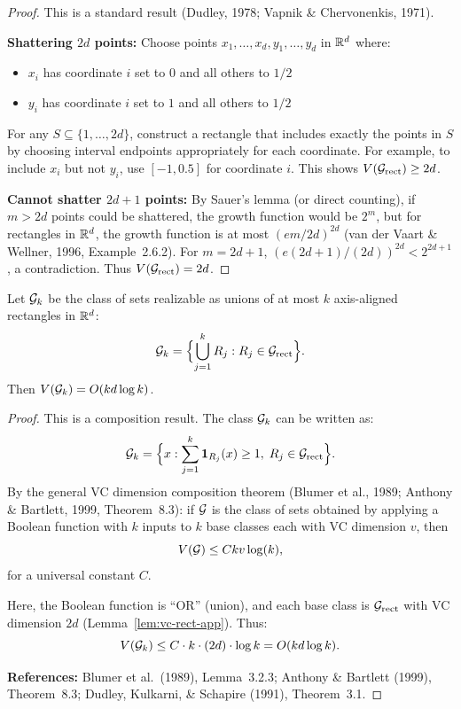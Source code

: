 \documentclass[12pt]{article}
\begin{document}
\begin{proof}
This is a standard result (Dudley, 1978; Vapnik \& Chervonenkis, 1971).

\textbf{Shattering $2d$ points:} Choose points $x_1, \ldots, x_d, y_1, \ldots, y_d$ in $\mathbb{R}^d$ where:
\begin{itemize}
\item $x_i$ has coordinate $i$ set to $0$ and all others to $1/2$
\item $y_i$ has coordinate $i$ set to $1$ and all others to $1/2$
\end{itemize}
For any $S \subseteq \{1,\ldots,2d\}$, construct a rectangle that includes exactly the points in $S$ by choosing interval endpoints appropriately for each coordinate. For example, to include $x_i$ but not $y_i$, use $[-1, 0.5]$ for coordinate $i$. This shows $V(\mathcal{G}_{\text{rect}}) \ge 2d$.

\textbf{Cannot shatter $2d+1$ points:} By Sauer's lemma (or direct counting), if $m > 2d$ points could be shattered, the growth function would be $2^m$, but for rectangles in $\mathbb{R}^d$, the growth function is at most $(em/2d)^{2d}$ (van der Vaart \& Wellner, 1996, Example~2.6.2). For $m = 2d+1$, $(e(2d+1)/(2d))^{2d} < 2^{2d+1}$, a contradiction. Thus $V(\mathcal{G}_{\text{rect}}) = 2d$.
\end{proof}

\begin{lemma}
\label{lem:vc-union-app}
Let $\mathcal{G}_k$ be the class of sets realizable as unions of at most $k$ axis-aligned rectangles in $\mathbb{R}^d$:
\[
\mathcal{G}_k = \Bigl\{ \bigcup_{j=1}^k R_j : R_j \in \mathcal{G}_{\text{rect}} \Bigr\}.
\]
Then $V(\mathcal{G}_k) = O(kd \log k)$.
\end{lemma}

\begin{proof}
This is a composition result. The class $\mathcal{G}_k$ can be written as:
\[
\mathcal{G}_k = \Bigl\{ x : \sum_{j=1}^k \mathbf{1}_{R_j}(x) \ge 1, \; R_j \in \mathcal{G}_{\text{rect}} \Bigr\}.
\]
By the general VC dimension composition theorem (Blumer et al., 1989; Anthony \& Bartlett, 1999, Theorem~8.3): if $\mathcal{G}$ is the class of sets obtained by applying a Boolean function with $k$ inputs to $k$ base classes each with VC dimension $v$, then
\[
V(\mathcal{G}) \le C k v \log(k),
\]
for a universal constant $C$.

Here, the Boolean function is ``OR'' (union), and each base class is $\mathcal{G}_{\text{rect}}$ with VC dimension $2d$ (Lemma~\ref{lem:vc-rect-app}). Thus:
\[
V(\mathcal{G}_k) \le C \cdot k \cdot (2d) \cdot \log k = O(kd \log k).
\]

\textbf{References:} Blumer et al.\ (1989), Lemma~3.2.3; Anthony \& Bartlett (1999), Theorem~8.3; Dudley, Kulkarni, \& Schapire (1991), Theorem~3.1.
\end{proof}
\end{document}
